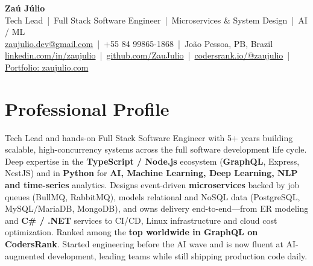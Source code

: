 \documentclass[11pt,a4paper]{article}
\begin{document}
\begin{center}
    {\Huge\bfseries Za\'u J\'ulio} \\[5pt]
    \small Tech Lead \,|\, Full Stack Software Engineer \,|\, Microservices \& System Design \,|\, AI / ML \\[4pt]
    \footnotesize
    \href{mailto:zaujulio.dev@gmail.com}{zaujulio.dev@gmail.com} \,|\, +55 84 99865-1868 \,|\, Jo\~ao Pessoa, PB, Brazil \\[2pt]
    \href{https://linkedin.com/in/zaujulio}{linkedin.com/in/zaujulio} \,|\,
    \href{https://github.com/ZauJulio}{github.com/ZauJulio} \,|\,
    \href{https://profile.codersrank.io/user/zaujulio}{codersrank.io/@zaujulio} \,|\,
    \href{https://zaujulio.com}{Portfolio: zaujulio.com}
\end{center}

\section{Professional Profile}
Tech Lead and hands-on Full Stack Software Engineer with 5+ years building scalable, high-concurrency systems across the full software development life cycle. Deep expertise in the \textbf{TypeScript / Node.js} ecosystem (\textbf{GraphQL}, Express, NestJS) and in \textbf{Python} for \textbf{AI, Machine Learning, Deep Learning, NLP and time-series} analytics. Designs event-driven \textbf{microservices} backed by job queues (BullMQ, RabbitMQ), models relational and NoSQL data (PostgreSQL, MySQL/MariaDB, MongoDB), and owns delivery end-to-end---from ER modeling and \textbf{C\# / .NET} services to CI/CD, Linux infrastructure and cloud cost optimization. Ranked among the \textbf{top worldwide in GraphQL on CodersRank}. Started engineering before the AI wave and is now fluent at AI-augmented development, leading teams while still shipping production code daily.

\end{document}
